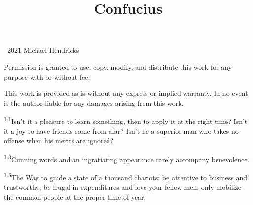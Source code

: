 \documentclass[openany,12pt,english]{book}
\title{Confucius}
\author{}
\date{}
\newenvironment{para}{\par\pretolerance=100\tolerance=200\setlength{\emergencystretch}{0.6em}\relax}{\par}
\begin{document}
\maketitle

{
\thispagestyle{empty}
\vspace*{\fill}
\begin{changemargin}{.8in}{.8in}
\begin{center}
\textcopyright{}~2021 Michael Hendricks

\vspace{0.5\baselineskip}

Permission is granted to use, copy, modify, and distribute
this work for any purpose with or without fee.

\vspace{0.5\baselineskip}

This work is provided as-is without any express or implied
warranty. In no event is the author liable for any damages
arising from this work.
\end{center}
\end{changemargin}
}
\clearpage{}

\clearpage{}

\markboth{}{}


\begin{para}
    \textsuperscript{1:1}\thinspace{}Is\-n't it a pleas\-ure to learn some\-thing, then to ap\-ply it at the right time? Is\-n't it a joy to have friends come from a\-far? Is\-n't he a su\-pe\-ri\-or man who takes no of\-fense when his mer\-its are ig\-nored?
\end{para}

\begin{para}
    \textsuperscript{1:3}\thinspace{}Cun\-ning words and an in\-gra\-ti\-at\-ing ap\-pear\-ance rare\-ly ac\-com\-pa\-ny be\-nev\-o\-lence.
\end{para}

\begin{para}
    \textsuperscript{1:5}\thinspace{}The Way to guide a state of a thou\-sand chariots: be at\-ten\-tive to busi\-ness and trust\-wor\-thy; be fru\-gal in expenditures and love your fel\-low men; on\-ly mo\-bi\-lize the com\-mon peo\-ple at the prop\-er time of year.
\end{para}
\end{document}
